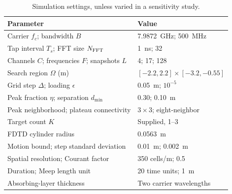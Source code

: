 \begin{table}[t]
\centering
\caption{Simulation settings, unless varied in a sensitivity study.}
\label{tab:sim_settings}
\footnotesize
\setlength{\tabcolsep}{3pt}
\begin{tabular}{p{}p{}}
\hline
Parameter & Value \\
\hline
Carrier $f_c$; bandwidth $B$ & 7.9872~GHz; 500~MHz \\
Tap interval $T_s$; FFT size $N_{\rm FFT}$ & 1~ns; 32 \\
Channels $C$; frequencies $F$; snapshots $L$ & 4; 17; 128 \\
Search region $\Omega$ (m) & $[-2.2,2.2]\times[-3.2,-0.55]$ \\
Grid step $\Delta$; loading $\epsilon$ & 0.05~m; $10^{-5}$ \\
Peak fraction $\eta$; separation $d_{\min}$ & 0.30; 0.10~m \\
Peak neighborhood; plateau connectivity & $3\times3$; eight-neighbor \\
Target count $K$ & Supplied, 1--3 \\
FDTD cylinder radius & 0.0563~m \\
Motion bound; step standard deviation & 0.01~m; 0.002~m \\
Spatial resolution; Courant factor & 350 cells/m; 0.5 \\
Duration; Meep length unit & 20 time units; 1~m \\
Absorbing-layer thickness & Two carrier wavelengths \\
\hline
\end{tabular}
\end{table}
